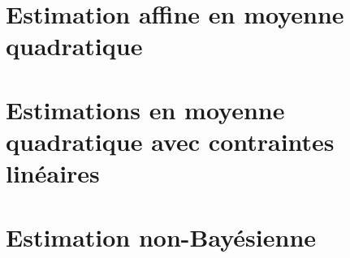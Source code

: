 \newpage
\section{Estimation affine en moyenne quadratique}

\section{Estimations en moyenne quadratique avec contraintes linéaires}

\section{Estimation non-Bayésienne}